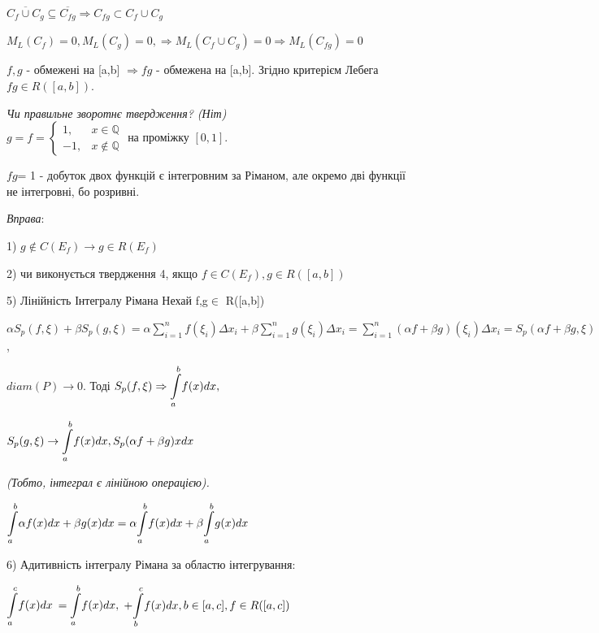 \documentclass[12pt]{report}
\begin{document}
			\vspace{2mm}
			$ \overline{C_f \cup C_g }   \subseteq  \overline{C_{fg}} \Rightarrow C_{fg} \subset
			C_f \cup C_g $
			
		  $	M_L(C_f) = 0, M_L(C_g)= 0, \Rightarrow M_L(C_f \cup C_g) = 0  \Rightarrow M_L(C_{fg}) = 0$ 
		  
		$  f,g $ - обмежені на [a,b]  $\Rightarrow  fg $ - обмежена на  [a,b]. Згідно критерієм Лебега $fg \in R([a, b])$. 
		
			\vspace{2mm}
	\textit{Чи правильне зворотнє твердження? (Ніт)}\\
	
 $g = f = \begin{cases} 1,& x \in \mathbb{Q}\\ -1, & x \notin \mathbb{Q} \end{cases}$ на проміжку $[0,1]$.
 
$fg $= 1 - добуток двох функцій є інтегровним за Ріманом, але окремо дві функції не інтегровні, бо розривні.

\textit{Вправа}:

1) $ g\notin C(E_f) \rightarrow g \in R(E_f)$

2) чи виконується твердження 4, якщо $f \in C(E_f), g \in R([a,b])$
	
\vspace{2mm}
5) Лінійність Інтегралу Рімана 
Нехай f,g$ \in$ R([a,b])

$\alpha S_p(f, \xi) + \beta S_p (g, \xi) = \alpha \sum\limits_{i=1}^{n}f(\xi_i)\Delta x_i + \beta \sum\limits_{i=1}^{n} g(\xi_i)\Delta x_i = \sum\limits_{i=1}^{n} (\alpha f +\beta g)(\xi_i)\Delta x_i = 
S_p(\alpha f+\beta g, \xi)$, 

$diam(P) \rightarrow 0. $ Тоді $S_p(f,\xi) \Rightarrow \mathlarger\int\limits_ a^b f(x)dx,$

$S_p(g, \xi) \rightarrow  \mathlarger\int\limits_ a^b f(x)dx,  S_p (\alpha f + \beta g )x dx$

\textit{(Тобто, інтеграл є лінійною операцією).}

$\mathlarger\int\limits_ a^b \alpha f(x)dx + \beta g(x)dx  = \alpha\mathlarger\int\limits_a^bf(x)dx +  \beta\mathlarger\int\limits_a^bg(x)dx   $

6) Адитивність інтегралу Рімана за областю інтегрування:

$ \mathlarger\int\limits_a^c f(x)dx  $
$= \mathlarger\int\limits_a^b f(x)dx,  $
$+ \mathlarger\int\limits_b^c f(x)dx,        b \in [a, c], f \in R ([a,c])$ 
\end{document}
